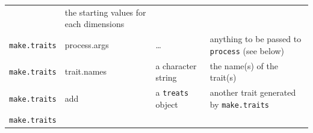 \documentclass[
]{book}
\begin{document}
\begin{longtable}[]{@{}llll@{}}
\begin{minipage}[t]{0.14\columnwidth}
\end{minipage} & \begin{minipage}[t]{0.33\columnwidth}\raggedright
the starting values for each dimensions\strut
\end{minipage}\tabularnewline
\begin{minipage}[t]{0.19\columnwidth}\raggedright
\texttt{make.traits}\strut
\end{minipage} & \begin{minipage}[t]{0.23\columnwidth}\raggedright
process.args\strut
\end{minipage} & \begin{minipage}[t]{0.14\columnwidth}\raggedright
\ldots{}\strut
\end{minipage} & \begin{minipage}[t]{0.33\columnwidth}\raggedright
anything to be passed to \texttt{process} (see below)\strut
\end{minipage}\tabularnewline
\begin{minipage}[t]{0.19\columnwidth}\raggedright
\texttt{make.traits}\strut
\end{minipage} & \begin{minipage}[t]{0.23\columnwidth}\raggedright
trait.names\strut
\end{minipage} & \begin{minipage}[t]{0.14\columnwidth}\raggedright
a character string\strut
\end{minipage} & \begin{minipage}[t]{0.33\columnwidth}\raggedright
the name(s) of the trait(s)\strut
\end{minipage}\tabularnewline
\begin{minipage}[t]{0.19\columnwidth}\raggedright
\texttt{make.traits}\strut
\end{minipage} & \begin{minipage}[t]{0.23\columnwidth}\raggedright
add\strut
\end{minipage} & \begin{minipage}[t]{0.14\columnwidth}\raggedright
a \texttt{treats} object\strut
\end{minipage} & \begin{minipage}[t]{0.33\columnwidth}\raggedright
another trait generated by \texttt{make.traits}\strut
\end{minipage}\tabularnewline
\begin{minipage}[t]{0.19\columnwidth}\raggedright
\texttt{make.traits}\strut
\end{minipage} & \begin{minipage}[t]{0.23\columnwidth}\raggedright

\end{minipage}
\end{longtable}
\end{document}
